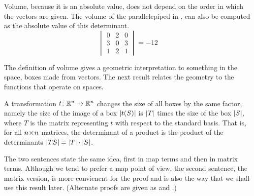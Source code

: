 \begin{example}
Volume, because it is an absolute value,
does not depend on the order in which the vectors are given.
The volume of the parallelepiped in ,
can also be computed as the absolute value of this determinant. 
\begin{equation*}
  \begin{vmatrix}
     0  &2 &0 \\
     3  &0 &3 \\
     1  &2 &1
  \end{vmatrix}=-12  
\end{equation*}
\end{example}

The definition of volume gives a geometric interpretation to
something in the space, boxes made from vectors.
The next result relates the geometry to the functions that operate on
spaces. 

\begin{theorem}
\label{th:MatChVolByDetMat}
A transformation \( \mbox{$t\colon \mathbb{R}^n\to \mathbb{R}^n$} \) changes the size of all boxes
by the same factor, namely the size of the image of a box
$\deter{t(S)}$ is $\deter{T}$ times the size of the box $\deter{S}$,
where $T$ is the matrix
representing $t$ with respect to the standard basis.
That is, for all $n \! \times \! n$ matrices, the determinant of a product is the
product of the determinants $\deter{TS}=\deter{T}\cdot\deter{S}$.
\end{theorem}

The two sentences state the same idea, first in map terms and then
in matrix terms. 
Although we tend to prefer a map point of view,
the second sentence, the matrix version, is more convienent for the proof
and is also the way that we shall use this result later.
(Alternate proofs are given as 
 and
.)


